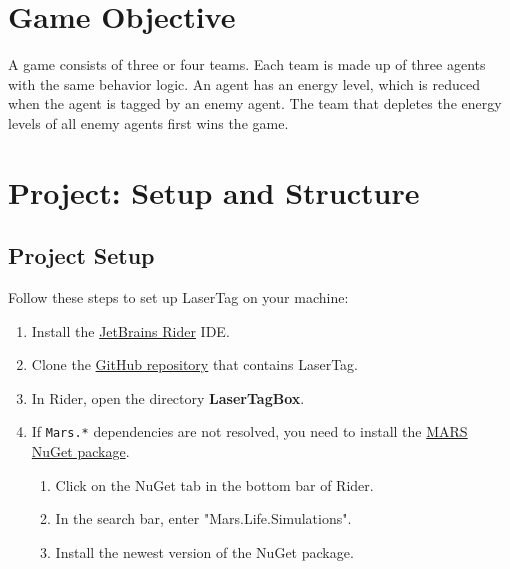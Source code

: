 \documentclass[a4paper,english,DIV=16,11pt,parskip=half,dvipsnames,listof=totoc,index=totoc,bibliography=totoc]{scrartcl}
\begin{document}
\section{Game Objective} \label{sec:objective}
%
A game consists of three or four teams. Each team is made up of three agents with the same behavior logic. An agent has an energy level, which is reduced when the agent is tagged by an enemy agent. The team that depletes the energy levels of all enemy agents first wins the game.
%
%
\section{Project: Setup and Structure} \label{sec:projsetupandstruc}
%
\subsection{Project Setup} \label{ssec:projsetup}
%
Follow these steps to set up LaserTag on your machine:
%
\begin{enumerate}
  \item Install the \href{https://www.jetbrains.com/rider/}{JetBrains Rider} IDE.
  \item Clone the \href{https://github.com/MARS-Group-HAW/model-mars-laser-tag-game}{GitHub repository} that contains LaserTag.
  \item In Rider, open the directory \textbf{LaserTagBox}.
  \item If \texttt{Mars.*} dependencies are not resolved, you need to install the \href{https://www.nuget.org/packages/Mars.Life.Simulations}{MARS NuGet package}.
  \begin{enumerate}
    \item Click on the NuGet tab in the bottom bar of Rider.
    \item In the search bar, enter "Mars.Life.Simulations".
    \item Install the newest version of the NuGet package.
  \end{enumerate}
\end{enumerate}
%
\end{document}
